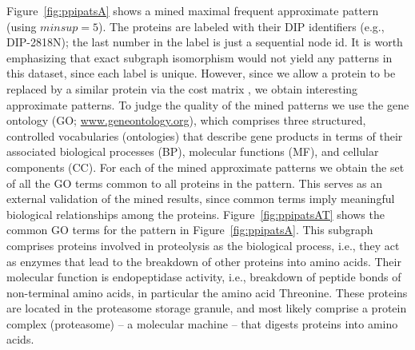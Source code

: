 \smallskip{}
Figure~\ref{fig:ppipatsA} shows a mined
maximal frequent approximate pattern (using $minsup=5$). The proteins
are labeled with their DIP identifiers (e.g., DIP-2818N); the last
number in the label is just a sequential node id.  It is worth
emphasizing that exact subgraph isomorphism would not yield any patterns
in this dataset, since each label is unique. However, since we allow a
protein to be replaced by a similar protein via the cost matrix ,
we obtain interesting approximate patterns. 
To judge the quality of the
mined patterns we use the gene ontology (GO;
\url{www.geneontology.org}), which comprises three structured,
controlled vocabularies (ontologies) that describe gene products in
terms of their associated biological processes (BP), molecular functions
(MF), and cellular components (CC).  For each of the mined approximate
patterns we obtain the set of all the GO terms common to all proteins in
the pattern. This serves as an external validation of the mined results,
since common terms imply meaningful biological relationships among the
proteins.  Figure~\ref{fig:ppipatsAT} shows the common GO terms for
the pattern in Figure~\ref{fig:ppipatsA}.  
This subgraph comprises proteins involved in proteolysis
as the biological process, i.e., they act as enzymes that lead to the
breakdown of other proteins into amino acids. Their molecular function
is endopeptidase activity, i.e., breakdown of peptide bonds of
non-terminal amino acids, in particular the amino acid Threonine.  These
proteins are located in the proteasome storage granule, and most likely
comprise a protein complex (proteasome) -- a molecular machine --
that digests proteins into amino acids.  
